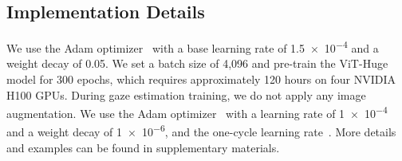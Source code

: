 \subsection{Implementation Details}
We use the Adam optimizer~\cite{kingma2014adam} with a base learning rate of \num{1.5e-4} and a weight decay of \num{0.05}.
We set a batch size of 4,096 and pre-train the ViT-Huge model for 300 epochs, which requires approximately 120 hours on four NVIDIA H100 GPUs.
During gaze estimation training, we do not apply any image augmentation.
We use the Adam optimizer~\cite{kingma2014adam} with a learning rate of \num{1e-4} and a weight decay of \num{1e-6}, and the one-cycle learning rate~\cite{smith2019super}.
More details and examples can be found in supplementary materials.

